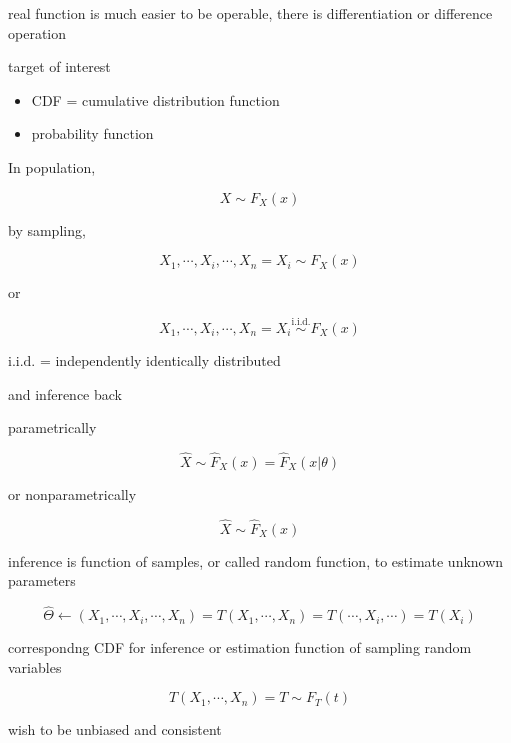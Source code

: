 \documentclass[
]{book}
\providecommand{\tightlist}{%
  \setlength{\itemsep}{0pt}\setlength{\parskip}{0pt}}
\theoremstyle{definition}
\theoremstyle{definition}
\theoremstyle{definition}
\theoremstyle{definition}
\theoremstyle{remark}
\begin{document}
real function is much easier to be operable, there is differentiation or difference operation

target of interest

\begin{itemize}
\tightlist
\item
  CDF = cumulative distribution function
\item
  probability function
\end{itemize}

In population,

\[
X\sim F_{{\scriptscriptstyle X}}\left(x\right)
\]

by sampling,

\[
X_{{\scriptscriptstyle 1}},\cdots,X_{{\scriptscriptstyle i}},\cdots,X_{{\scriptscriptstyle n}}=X_{{\scriptscriptstyle i}}\sim F_{{\scriptscriptstyle X}}\left(x\right)
\]

or

\[
X_{{\scriptscriptstyle 1}},\cdots,X_{{\scriptscriptstyle i}},\cdots,X_{{\scriptscriptstyle n}}=X_{{\scriptscriptstyle i}}\overset{\text{i.i.d.}}{\sim}F_{{\scriptscriptstyle X}}\left(x\right)
\]

\(\text{i.i.d.}\) = independently identically distributed

and inference back

parametrically

\[
\widehat{X}\sim\widehat{F}_{{\scriptscriptstyle X}}\left(x\right)=\widehat{F}_{{\scriptscriptstyle X}}\left(x|\theta\right)
\]

or nonparametrically

\[
\hat{X}\sim\hat{F}_{{\scriptscriptstyle X}}\left(x\right)
\]

inference is function of samples, or called random function, to estimate unknown parameters

\[
\widehat{\Theta}\leftarrow\left(X_{{\scriptscriptstyle 1}},\cdots,X_{{\scriptscriptstyle i}},\cdots,X_{{\scriptscriptstyle n}}\right)=T\left(X_{{\scriptscriptstyle 1}},\cdots,X_{{\scriptscriptstyle n}}\right)=T\left(\cdots,X_{{\scriptscriptstyle i}},\cdots\right)=T\left(X_{{\scriptscriptstyle i}}\right)
\]

correspondng CDF for inference or estimation function of sampling random variables

\[
T\left(X_{{\scriptscriptstyle 1}},\cdots,X_{{\scriptscriptstyle n}}\right)=T\sim F_{{\scriptscriptstyle T}}\left(t\right)
\]

wish to be unbiased and consistent
\end{document}
